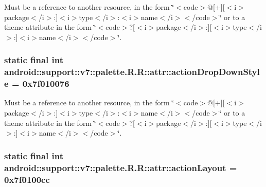 Must be a reference to another resource, in the form \char`\"{}$<$code$>$@\mbox{[}+\mbox{]}\mbox{[}$<$i$>$package$<$/i$>$:\mbox{]}$<$i$>$type$<$/i$>$:$<$i$>$name$<$/i$>$$<$/code$>$\char`\"{} or to a theme attribute in the form \char`\"{}$<$code$>$?\mbox{[}$<$i$>$package$<$/i$>$:\mbox{]}\mbox{[}$<$i$>$type$<$/i$>$:\mbox{]}$<$i$>$name$<$/i$>$$<$/code$>$\char`\"{}. \hypertarget{classandroid_1_1support_1_1v7_1_1palette_1_1_r_1_1attr_096dc2775afa457c067bb1ab48a63db9}{
\subsubsection[{actionDropDownStyle}]{\setlength{\rightskip}{0pt plus 5cm}static final int android::support::v7::palette.R.R::attr::actionDropDownStyle = 0x7f010076}}
\label{classandroid_1_1support_1_1v7_1_1palette_1_1_r_1_1attr_096dc2775afa457c067bb1ab48a63db9}


Must be a reference to another resource, in the form \char`\"{}$<$code$>$@\mbox{[}+\mbox{]}\mbox{[}$<$i$>$package$<$/i$>$:\mbox{]}$<$i$>$type$<$/i$>$:$<$i$>$name$<$/i$>$$<$/code$>$\char`\"{} or to a theme attribute in the form \char`\"{}$<$code$>$?\mbox{[}$<$i$>$package$<$/i$>$:\mbox{]}\mbox{[}$<$i$>$type$<$/i$>$:\mbox{]}$<$i$>$name$<$/i$>$$<$/code$>$\char`\"{}. \hypertarget{classandroid_1_1support_1_1v7_1_1palette_1_1_r_1_1attr_e06997a773f73302645a6b5b5ec0e5da}{
\subsubsection[{actionLayout}]{\setlength{\rightskip}{0pt plus 5cm}static final int android::support::v7::palette.R.R::attr::actionLayout = 0x7f0100cc}}
\label{classandroid_1_1support_1_1v7_1_1palette_1_1_r_1_1attr_e06997a773f73302645a6b5b5ec0e5da}


